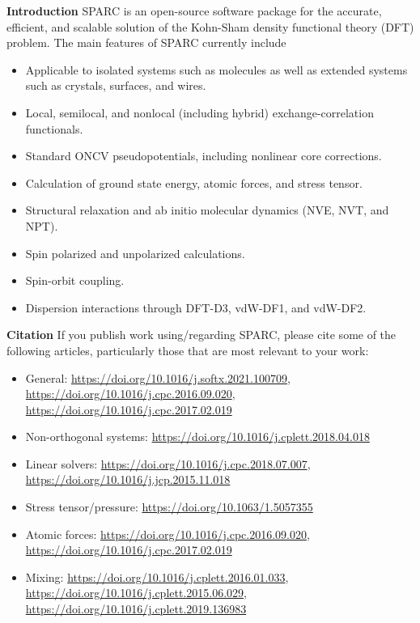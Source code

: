 \begin{frame}[allowframebreaks]{\textbf{Introduction}} \label{Introduction}
  SPARC is an open-source software package for the accurate, efficient, and scalable solution of the Kohn-Sham density functional theory (DFT) problem. The main features of SPARC currently include
  \begin{itemize}
    \item Applicable to isolated systems such as molecules as well as extended systems such as crystals, surfaces, and wires.
    \item Local, semilocal, and nonlocal (including hybrid) exchange-correlation functionals.
    \item Standard ONCV pseudopotentials, including nonlinear core corrections.
    \item Calculation of ground state energy, atomic forces, and stress tensor.
    \item Structural relaxation and ab initio molecular dynamics (NVE, NVT, and NPT).
    \item Spin polarized and unpolarized calculations.
    \item Spin-orbit coupling.
    \item Dispersion interactions through DFT-D3, vdW-DF1, and vdW-DF2.
  \end{itemize}
  
  \end{frame}
  
  
  \begin{frame}[allowframebreaks]{\textbf{Citation}} \label{Citation}
  If you publish work using/regarding SPARC, please cite some of the following articles, particularly those that are most relevant to your work:
  \begin{itemize}
      \item General: \url{https://doi.org/10.1016/j.softx.2021.100709}, \url{https://doi.org/10.1016/j.cpc.2016.09.020}, \url{https://doi.org/10.1016/j.cpc.2017.02.019}
      \item Non-orthogonal systems: \url{https://doi.org/10.1016/j.cplett.2018.04.018}
      \item Linear solvers: \url{https://doi.org/10.1016/j.cpc.2018.07.007},    \url{https://doi.org/10.1016/j.jcp.2015.11.018}
      \item Stress tensor/pressure: \url{https://doi.org/10.1063/1.5057355}
      \item Atomic forces: \url{https://doi.org/10.1016/j.cpc.2016.09.020}, \url{https://doi.org/10.1016/j.cpc.2017.02.019}
      \item Mixing: \url{https://doi.org/10.1016/j.cplett.2016.01.033}, \url{https://doi.org/10.1016/j.cplett.2015.06.029}, \url{https://doi.org/10.1016/j.cplett.2019.136983}
  \end{itemize}
  \end{frame}
  
